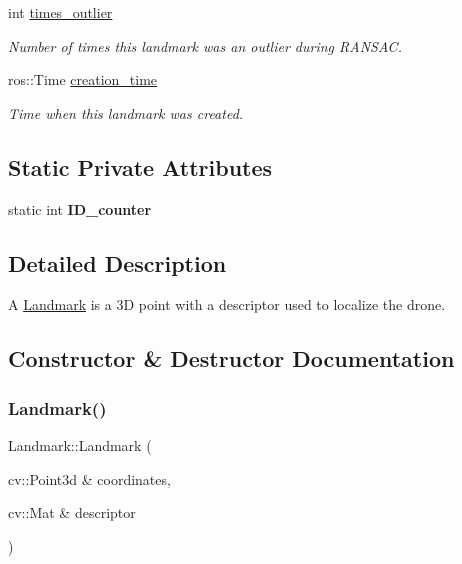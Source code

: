 \begin{DoxyCompactItemize}
\mbox{\label{structLandmark_ae942ecddd4c541e4e83c047fafd3d57b}} 
int \hyperlink{structLandmark_ae942ecddd4c541e4e83c047fafd3d57b}{times\+\_\+outlier}
\begin{DoxyCompactList}\small\item\em Number of times this landmark was an outlier during R\+A\+N\+S\+AC. \end{DoxyCompactList}\item 
\mbox{\label{structLandmark_a8c76e8e5bd6a2a2dadb6f265ed675ea8}} 
ros\+::\+Time \hyperlink{structLandmark_a8c76e8e5bd6a2a2dadb6f265ed675ea8}{creation\+\_\+time}
\begin{DoxyCompactList}\small\item\em Time when this landmark was created. \end{DoxyCompactList}\end{DoxyCompactItemize}
\subsection*{Static Private Attributes}
\begin{DoxyCompactItemize}
\item 
\mbox{\label{structLandmark_ac16679901a25ce77e612d27a6104e465}} 
static int {\bfseries I\+D\+\_\+counter}
\end{DoxyCompactItemize}


\subsection{Detailed Description}
A \hyperlink{structLandmark}{Landmark} is a 3D point with a descriptor used to localize the drone. 

\subsection{Constructor \& Destructor Documentation}
\mbox{\label{structLandmark_a17dfe0ec5742240823d44deb443c6046}} 
\subsubsection{\texorpdfstring{Landmark()}{Landmark()}}
{\footnotesize\ttfamily Landmark\+::\+Landmark (\begin{DoxyParamCaption}\item[{cv\+::\+Point3d \&}]{coordinates,  }\item[{cv\+::\+Mat \&}]{descriptor }\end{DoxyParamCaption})}



